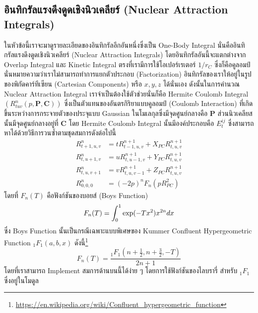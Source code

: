 \subsection{อินทิกรัลแรงดึงดูดเชิงนิวเคลียร์ (Nuclear Attraction Integrals)}

ในหัวข้อนี้เราจะมาดูรายละเอียดของอินทิกรัลอีกอันหนึ่งซึ่งเป็น One-Body Integral นั่นคืออินทิกรัลแรงดึงดูดเชิงนิวเคลียร์ (Nuclear Attraction Integrals) โดยอินทิกรัลอันนี้จะแตกต่างจาก Overlap Integral และ Kinetic Integral ตรงที่เรามีการใช้โอเปอร์เรเตอร์ $1/r_C$ ซึ่งก็คือคูลอมป์ นั่นหมายความว่าเราไม่สามารถทำการแยกตัวประกอบ (Factorization) อินทิกรัลของเราให้อยู่ในรูปของพิกัดคาร์ทีเซียน (Cartesian Components) หรือ $x,y,z$ ได้นั่นเอง ดังนั้นในการคำนวณ Nuclear Attraction Integral เราจำเป็นต้องใช้ตัวช่วยนั่นก็คือ Hermite Coulomb Integral $(R^n_{tuv}(p,\mathbf{P},\mathbf{C}))$ ซึ่งเป็นตัวแทนของอันตรกิริยาแบบคูลอมป์ (Coulomb Interaction) ที่เกิดขึ้นระหว่างการกระจายตัวของประจุแบบ Gaussian ในโมเลกุลซึ่งมีจุดศูนย์กลางคือ $\mathbf{P}$ ส่วนนิวเคลียสนั้นมีจุดศูนย์กลางอยู่ที่ $\mathbf{C}$ โดย Hermite Coulomb Integral นั้นมีองค์ประกอบคือ $E_t^{ij}$ ซึ่งสามารถหาได้ด้วยวิธีการวนซ้ำตามชุดสมการดังต่อไปนี้
%
\begin{align}
  R^{n}_{t+1,u,v} & = t R^{n+1}_{t-1,u,v} + X_{PC}R^{n+1}_{t,u,v} \\
  R^{n}_{t,u+1,v} & = u R^{n+1}_{t,u-1,v} + Y_{PC}R^{n+1}_{t,u,v} \\
  R^{n}_{t,u,v+1} & = v R^{n+1}_{t,u,v-1} + Z_{PC}R^{n+1}_{t,u,v} \\
  R^{n}_{0,0,0}   & = (-2p)^n F_n (p R_{PC}^2)
\end{align}
%
โดยที่ $F_n(T)$ คือฟังก์ชันของบอยส์ (Boys Function)
%
\begin{equation}
  F_n(T)
  =
  \int_0^1 \hbox{exp}(-Tx^2)x^{2n}dx
\end{equation}
%
ซึ่ง Boys Function นั้นเป็นกรณีเฉพาะแบบพิเศษของ Kummer Confluent Hypergeometric Function $_1F_1(a,b,x)$ ดังนี้\footnote{\url{https://en.wikipedia.org/wiki/Confluent_hypergeometric_function}}
%
\begin{equation}
  F_n(T)
  =
  \frac{_1F_1(n+\frac{1}{2}, n+\frac{3}{2}, -T)}{2n+1}
\end{equation}
%
โดยที่เราสามารถ Implement สมการด้านบนนี้ได้ง่าย ๆ โดยการใช้ฟังก์ชันของไลบรารี่  สำหรับ $_1F_1$ ซึ่งอยู่ในโมดูล 

